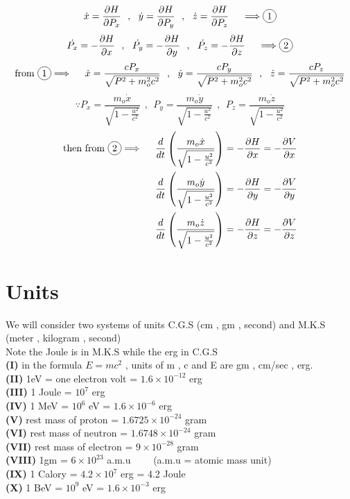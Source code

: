\[
\dot{x} = \frac{\partial H}{\partial P_x}
\ \ , \ \
\dot{y} = \frac{\partial H}{\partial P_y}
\ \ , \ \
\dot{z} = \frac{\partial H}{\partial P_z}
\ \ \ \
\Longrightarrow  \circled{1}
\]
\[
\dot{P_x} =-\frac{\partial H}{\partial x}
\ \ , \ \
\dot{P_y} =-\frac{\partial H}{\partial y}
\ \ , \ \
\dot{P_z} =-\frac{\partial H}{\partial z}
\ \ \ \
\Longrightarrow  \circled{2}
\]
\[
\text{from }  \circled{1} \Longrightarrow 
\ \ \ \
\dot{x} = \frac{c P_x}{\sqrt{P^2 + m_o^2 c^2}}
\ \ , \ \
\dot{y} = \frac{c P_y}{\sqrt{P^2 + m_o^2 c^2}}
\ \ , \ \
\dot{z} = \frac{c P_z}{\sqrt{P^2 + m_o^2 c^2}}
\]
\[
\because
P_x = \frac{m_o \dot{x}}{\sqrt{1 - \frac{u^2}{c^2}}}
\ \ , \ \
P_y = \frac{m_o \dot{y}}{\sqrt{1 - \frac{u^2}{c^2}}}
\ \ , \ \
P_z = \frac{m_o \dot{z}}{\sqrt{1 - \frac{u^2}{c^2}}}
\]
\begin{align*}
    \text{then from }  \circled{2} \Longrightarrow 
    \ \ \ \
    \frac{d}{dt}\left(\frac{m_o \dot{x}}{\sqrt{1 - \frac{u^2}{c^2}}}\right) &= -\frac{\partial H}{\partial x} = -\frac{\partial V}{\partial x}\\
    \frac{d}{dt}\left(\frac{m_o \dot{y}}{\sqrt{1 - \frac{u^2}{c^2}}}\right) &= -\frac{\partial H}{\partial y} = -\frac{\partial V}{\partial y}\\
    \frac{d}{dt}\left(\frac{m_o \dot{z}}{\sqrt{1 - \frac{u^2}{c^2}}}\right) &= -\frac{\partial H}{\partial z} = -\frac{\partial V}{\partial z}
\end{align*}
\section{Units}
We will consider two systems of units C.G.S (cm , gm , second) and M.K.S (meter , kilogram , second)\\
Note the Joule is in M.K.S while the erg in C.G.S
\\\textbf{(I)} in the formula $E = m c^2$ , units of m , c and E are gm , cm/sec , erg.
\\\textbf{(II)} 1eV = one electron volt = $1.6 \times 10^{-12}$ erg
\\\textbf{(III)} 1 Joule = $10^{7}$ erg
\\\textbf{(IV)} 1 MeV = $10^{6}$ eV = $1.6 \times 10^{-6}$ erg
\\\textbf{(V)} rest mass of proton = $1.6725 \times 10^{-24}$ gram
\\\textbf{(VI)} rest mass of neutron = $1.6748 \times 10^{-24}$ gram
\\\textbf{(VII)} rest mass of electron = $9 \times 10^{-28}$ gram
\\\textbf{(VIII)} 1gm = $6 \times 10^{23}$ a.m.u \ \ \ \ (a.m.u = atomic mass unit)
\\\textbf{(IX)} 1 Calory = $4.2 \times 10^7$ erg = 4.2 Joule
\\\textbf{(X)} 1 BeV = $10^{9}$ eV = $1.6 \times 10^{-3}$ erg